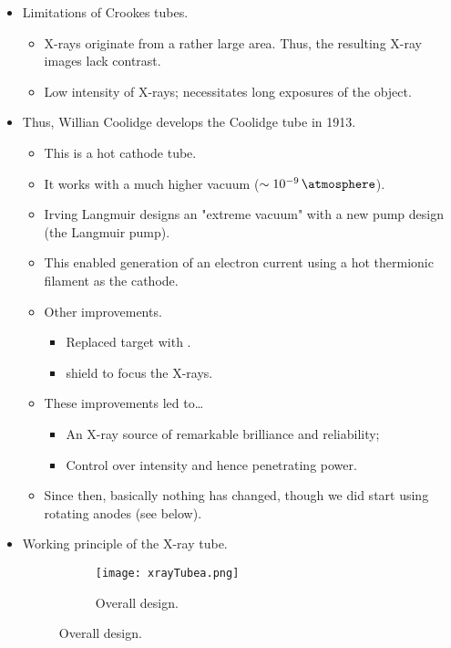 \documentclass[../notes.tex]{subfiles}
\begin{document}
\begin{itemize}
\begin{itemize}
    \end{itemize}
    \item Limitations of Crookes tubes.
    \begin{itemize}
        \item X-rays originate from a rather large area. Thus, the resulting X-ray images lack contrast.
        \item Low intensity of X-rays; necessitates long exposures of the object.
    \end{itemize}
    \item Thus, Willian Coolidge develops the Coolidge tube in 1913.
    \begin{itemize}
        \item This is a hot cathode tube.
        \item It works with a much higher vacuum ($\sim\SI{e-9}{\atmosphere}$).
        \item Irving Langmuir designs an "extreme vacuum" with a new pump design (the Langmuir pump).
        \item This enabled generation of an electron current using a hot thermionic filament as the cathode.
        \item Other improvements.
        \begin{itemize}
            \item Replaced  target with .
            \item {} shield to focus the X-rays.
        \end{itemize}
        \item These improvements led to\dots
        \begin{itemize}
            \item An X-ray source of remarkable brilliance and reliability;
            \item Control over intensity and hence penetrating power.
        \end{itemize}
        \item Since then, basically nothing has changed, though we did start using rotating anodes (see below).
    \end{itemize}
    \item Working principle of the X-ray tube.
    \begin{figure}[h!]
        \centering
        \begin{subfigure}[b]{0.4\linewidth}
            \centering
            \texttt{[image: xrayTubea.png]}
            \caption{Overall design.}

\end{subfigure}
\end{figure}
\end{itemize}
\end{document}
